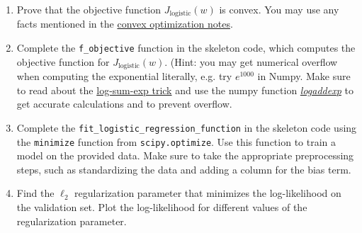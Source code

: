 \documentclass{article}
\theoremstyle{plain}
\theoremstyle{definition}
\begin{document}
\begin{enumerate}
  \setcounter{enumi}{\value{saveenum}}
\item Prove that the objective function $J_{\text{logistic}}(w)$ is convex.
You may use any facts mentioned in the \href{https://davidrosenberg.github.io/mlcourse/Notes/convex-optimization.pdf}{convex optimization notes}.

\item Complete the \texttt{f\_objective} function in the skeleton code,
which computes the objective function for $J_{\text{logistic}}(w)$.
(Hint: you may get numerical overflow when computing the exponential literally,
e.g. try $e^{1000}$ in Numpy.
Make sure to read about the
\href{https://blog.feedly.com/tricks-of-the-trade-logsumexp/}{log-sum-exp trick}
and use the numpy function
\textit{ \href{https://docs.scipy.org/doc/numpy/reference/generated/numpy.logaddexp.html}{logaddexp}
}
to get accurate calculations
and to prevent overflow.

\item Complete the \texttt{fit\_logistic\_regression\_function} in the skeleton
code using the \texttt{minimize} function from \texttt{scipy.optimize}.
Use this function to train
a model on the provided data. Make sure to take the appropriate preprocessing
steps, such as standardizing the data and adding a column for the
bias term. 

\item Find the $\ell_{2}$ regularization parameter that minimizes the log-likelihood
on the validation set. Plot the log-likelihood for different values
of the regularization parameter. 


\end{enumerate}
\end{document}
